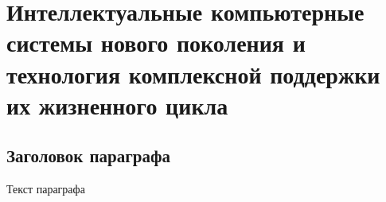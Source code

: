\chapter{Интеллектуальные компьютерные системы нового поколения и технология комплексной поддержки их жизненного цикла}
\label{chapter_new_generation_systems} 


\section{Заголовок параграфа}
Текст параграфа

%